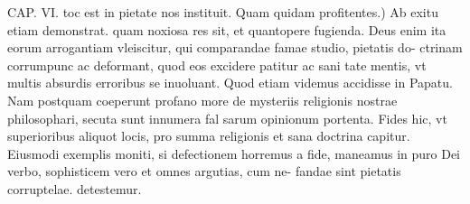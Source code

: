 \documentclass{article}
\begin{document}
\begin{pages}
\marginpar{[ p.87]}CAP. VI. \pstart toc est in pietate nos instituit.  \pend\pstart Quam quidam profitentes.) Ab exitu etiam demonstrat. quam noxiosa res sit, et quantopere fugienda. Deus enim ita eorum arrogantiam vleiscitur, qui comparandae famae studio, pietatis do- ctrinam corrumpunc ac deformant, quod eos excidere patitur ac sani tate mentis, vt multis absurdis erroribus se inuoluant. Quod etiam videmus accidisse in Papatu. Nam postquam coeperunt profano more de mysteriis religionis nostrae philosophari, secuta sunt innumera fal sarum opinionum portenta. Fides hic, vt superioribus aliquot locis, pro summa religionis et sana doctrina capitur. Eiusmodi exemplis moniti, si defectionem horremus a fide, maneamus in puro Dei verbo, sophisticem vero et omnes argutias, cum ne- fandae sint pietatis corruptelae. detestemur.  \pend
\endnumbering
\end{pages}
\end{document}
